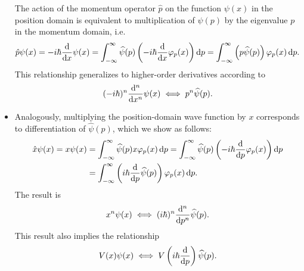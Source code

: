 \documentclass[11pt, a4paper]{article}
\newcommand{\diff}{\mathop{}\!\mathrm{d}} %
\newcommand{\F}[1]{\widehat{#1}} %
\begin{document}
\begin{itemize}
    The action of the momentum operator $ \hat{p} $ on the function $ \psi(x) $ in the position domain is equivalent to multiplication of $ \F{\psi}(p) $ by the eigenvalue $ p $ in the momentum domain, i.e.
    \begin{equation*}
        \hat{p} \psi(x) = - i \hbar \dv{x} \psi(x) = \int_{-\infty}^{\infty}\F{\psi}(p) \left( -i \hbar \dv{x} \varphi_{p}(x) \right)\diff p = \int_{-\infty}^{\infty}\left( p \F{\psi}(p) \right) \varphi_{p}(x)\diff p.
    \end{equation*}
    This relationship generalizes to higher-order derivatives according to
    \begin{equation*}
        (- i \hbar)^{n}\dv[n]{}{x} \psi(x) \iff p^{n} \F{\psi}(p).
    \end{equation*}
    
    \item Analogously, multiplying the position-domain wave function by $ x $ corresponds to differentiation of $ \F{\psi}(p) $, which we show as follows:
    \begin{align*}
        \hat{x}\psi(x) = x \psi(x) &= \int_{-\infty}^{\infty}\F{\psi}(p)x \varphi_{p}(x)\diff p = \int_{-\infty}^{\infty}\F{\psi}(p) \left( -i \hbar \dv{p}\varphi_{p}(x) \right)\diff p\\
        & = \int_{-\infty}^{\infty}\left( i \hbar \dv{p}\F{\psi}(p) \right)\varphi_{p}(x)\diff p.
    \end{align*}
    The result is
    \begin{equation*}
        x^{n}\psi(x) \iff (i \hbar)^{n} \dv[n]{}{p}\F{\psi}(p).
    \end{equation*}
    This result also implies the relationship
    \begin{equation*}
        V(x) \psi(x) \iff V \left( i \hbar \dv{p} \right) \F{\psi}(p).
    \end{equation*}
    
\end{itemize}
\end{document}
